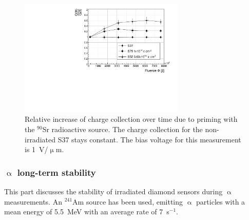 \begin{figure}[!t]
\begin{center}
\includegraphics[width=0.7\textwidth]{03_measurement_results/plots/ccdpriming}
\caption{Relative increase of charge collection over time due to priming with the $^{90}$Sr radioactive source. The charge collection for the non-irradiated S37 stays constant. The bias voltage for this measurement is 1~V/$\upmu$m.}
\label{fig:ccincrease}
\end{center}
\end{figure}

\subsubsection{$\upalpha$ long-term stability}
This part discusses the stability of irradiated diamond sensors during $\upalpha$ measurements. An $^{241}$Am source has been used, emitting $\upalpha$ particles with a mean energy of 5.5~MeV with an average rate of 7~s$^{-1}$. 


